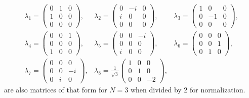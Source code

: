 \[ \begin{array} {ccc}
    \lambda_1 = \left(\begin{array} {ccc}0 & 1 & 0 \\ 1 & 0 & 0 \\ 0 & 0 & 0 \end{array}\right),                    &
    \lambda_2 =\left( \begin{array} {ccc}0 & -i & 0 \\ i & 0 & 0 \\ 0 & 0 & 0 \end{array}\right),                    &
    \lambda_3 = \left(\begin{array} {ccc}1 & 0 & 0 \\ 0 & -1 & 0 \\ 0 & 0 & 0 \end{array}\right),                      \\
    \lambda_4 = \left(\begin{array} {ccc}0 & 0 & 1 \\ 0 & 0 & 0 \\ 1 & 0 & 0 \end{array}\right) ,                   &
    \lambda_5 = \left(\begin{array} {ccc}0 & 0 & -i \\ 0 & 0 & 0 \\ i & 0 & 0 \end{array}\right) ,                   &
    \lambda_6 = \left(\begin{array} {ccc}0 & 0 & 0 \\ 0 & 0 & 1 \\ 0 & 1 & 0 \end{array}\right) ,                     \\
    \lambda_7 = \left(\begin{array} {ccc}0 & 0 & 0 \\ 0 & 0 & -i \\ 0 & i & 0 \end{array}\right) ,                   &
    \lambda_8 = \frac{1}{\sqrt{3}} \left(\begin{array} {ccc}1 & 0 & 0 \\ 0 & 1 & 0 \\ 0 & 0 & -2 \end{array}\right), &
  \end{array} \]
are also matrices of that form for $N=3$ when divided by 2 for normalization.

